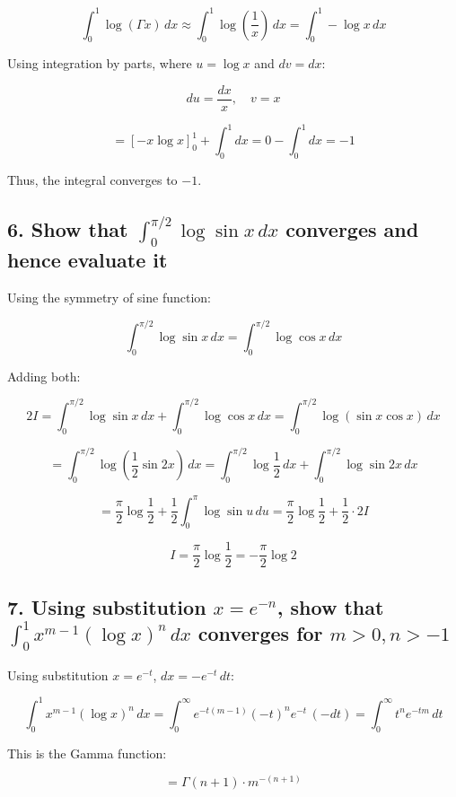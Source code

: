\documentclass{article}
\begin{document}
\[
\int_0^1 \log(\Gamma x) \, dx \approx \int_0^1 \log \left( \frac{1}{x} \right) \, dx = \int_0^1 -\log x \, dx
\]


Using integration by parts, where \( u = \log x \) and \( dv = dx \):


\[
du = \frac{dx}{x}, \quad v = x
\]




\[
= \left[ -x \log x \right]_0^1 + \int_0^1 dx = 0 - \int_0^1 dx = -1
\]


Thus, the integral converges to \(-1\).

\subsection*{6. Show that \(\int_0^{\pi/2} \log \sin x \, dx\) converges and hence evaluate it}
Using the symmetry of sine function:


\[
\int_0^{\pi/2} \log \sin x \, dx = \int_0^{\pi/2} \log \cos x \, dx
\]


Adding both:


\[
2I = \int_0^{\pi/2} \log \sin x \, dx + \int_0^{\pi/2} \log \cos x \, dx = \int_0^{\pi/2} \log (\sin x \cos x) \, dx
\]




\[
= \int_0^{\pi/2} \log \left( \frac{1}{2} \sin 2x \right) \, dx = \int_0^{\pi/2} \log \frac{1}{2} \, dx + \int_0^{\pi/2} \log \sin 2x \, dx
\]




\[
= \frac{\pi}{2} \log \frac{1}{2} + \frac{1}{2} \int_0^\pi \log \sin u \, du = \frac{\pi}{2} \log \frac{1}{2} + \frac{1}{2} \cdot 2I
\]




\[
I = \frac{\pi}{2} \log \frac{1}{2} = -\frac{\pi}{2} \log 2
\]



\subsection*{7. Using substitution \( x = e^{-n} \), show that \(\int_0^1 x^{m-1} (\log x)^n \, dx \) converges for \( m > 0, n > -1 \)}
Using substitution \( x = e^{-t} \), \( dx = -e^{-t} \, dt \):


\[
\int_0^1 x^{m-1} (\log x)^n \, dx = \int_0^\infty e^{-t(m-1)} (-t)^n e^{-t} \, (-dt) = \int_0^\infty t^n e^{-tm} \, dt
\]


This is the Gamma function:


\[
= \Gamma(n+1) \cdot m^{-(n+1)}
\]
\end{document}
